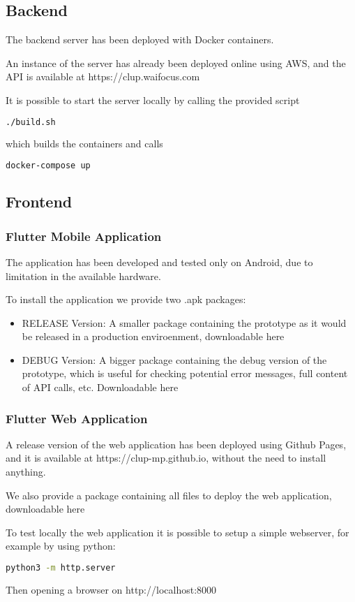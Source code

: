 \subsection{Backend}
The backend server has been deployed with Docker containers.

An instance of the server has already been deployed online using AWS, and the API is available at https://clup.waifocus.com

It is possible to start the server locally by calling the provided script
\begin{lstlisting}[language=bash]
    ./build.sh
\end{lstlisting}
which builds the containers and calls
\begin{lstlisting}[language=bash]
    docker-compose up
\end{lstlisting}

\subsection{Frontend}

\subsubsection{Flutter Mobile Application}
The application has been developed and tested only on Android, due to limitation in the available hardware.

To install the application we provide two .apk packages:
\begin{itemize}
    \item RELEASE Version: A smaller package containing the prototype as it would be released in a production enviroenment, downloadable here
    \item DEBUG Version: A bigger package containing the debug version of the prototype, which is useful for checking potential error messages, full content of API calls, etc. Downloadable here
\end{itemize}

\subsubsection{Flutter Web Application}
A release version of the web application has been deployed using Github Pages, and it is available at https://clup-mp.github.io, without the need to install anything.

We also provide a package containing all files to deploy the web application, downloadable here

To test locally the web application it is possible to setup a simple webserver, for example by using python:
\begin{lstlisting}[language=bash]
    python3 -m http.server
\end{lstlisting}
Then opening a browser on http://localhost:8000

